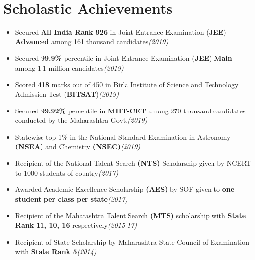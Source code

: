 \documentclass[10pt,a4paper,sans]{moderncv}        %
\newcommand{\rhsmall}[1]{\hfill{\footnotesize{\textsl{(#1)}}}}
\begin{document}
\section{Scholastic Achievements}
\begin{itemize}
	\item Secured \textbf{All India Rank 926} in Joint Entrance Examination (\textbf{JEE}) \textbf{Advanced} among 161 thousand candidates\rhsmall{2019}
	\item Secured \textbf{99.9\%} percentile in Joint Entrance Examination (\textbf{JEE}) \textbf{Main} among 1.1 million candidates\rhsmall{2019}
	\item Scored \textbf{418} marks out of 450 in Birla Institute of Science and Technology Admission Test (\textbf{BITSAT})\rhsmall{2019}
	\item Secured \textbf{99.92\%} percentile in \textbf{MHT-CET} among 270 thousand candidates conducted by the Maharashtra Govt.\rhsmall{2019} 
	\item Statewise top 1\% in the National Standard Examination in Astronomy \textbf{(NSEA)} and Chemistry \textbf{(NSEC)}\rhsmall{2019}
\end{itemize}
\begin{itemize}
	\item Recipient of the National Talent Search \textbf{(NTS)} Scholarship given by NCERT to 1000 students of country\rhsmall{2017}
	\item Awarded Academic Excellence Scholarship \textbf{(AES)} by SOF given to \textbf{one  student per class per state}\rhsmall{2017}
	\item Recipient of the Maharashtra Talent Search \textbf{(MTS)} scholarship  with \textbf{State Rank 11, 10, 16} respectively\rhsmall{2015-17}%
	\item Recipient of State Scholarship by Maharashtra State Council of Examination with \textbf{State Rank 5}\rhsmall{2014}
\end{itemize}
\end{document}
